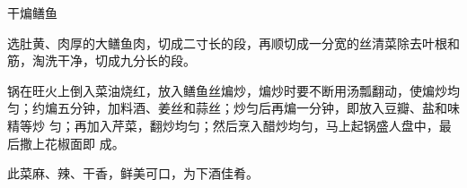 %
%
%
%
%
%
%
\begin{recipe}{干煸鳝鱼}

\ingredients


\preparation

\step 选肚黄、肉厚的大鳝鱼肉，切成二寸长的段，再顺切成一分宽的丝清菜除去叶根和
筋，淘洗干净，切成九分长的段。

\step 锅在旺火上倒入菜油烧红，放入鳝鱼丝煸炒，煸炒时要不断用汤瓢翻动，使煸炒均
匀；约煸五分钟，加料酒、姜丝和蒜丝；炒匀后再煸一分钟，即放入豆瓣、盐和味精等炒
匀；再加入芹菜，翻炒均匀；然后烹入醋炒均匀，马上起锅盛人盘中，最后撒上花椒面即
成。

\features

此菜麻、辣、干香，鲜美可口，为下酒佳肴。

\end{recipe}

